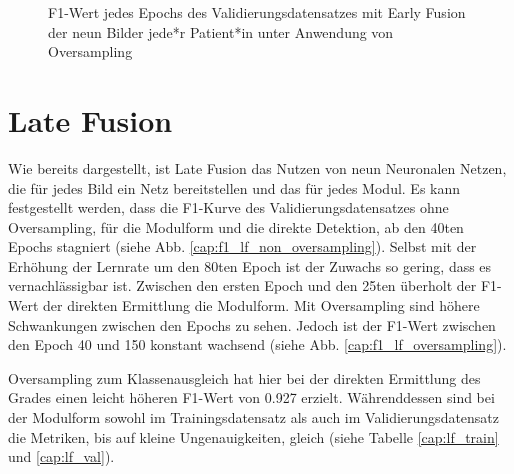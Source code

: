 \begin{figure}[b]\centering
\makebox[0pt]{}
\caption[F1-Wert jedes Epochs des Validierungsdatensatzes mit Early Fusion unter Anwendung von Oversampling]{F1-Wert jedes Epochs des Validierungsdatensatzes mit Early Fusion der neun Bilder jede*r Patient*in unter Anwendung von Oversampling}\label{cap:f1_ef_oversampling}
\end{figure}\label{fig:f1_ef_oversampling}

\clearpage
\section{Late Fusion}\label{latefusion}
Wie bereits dargestellt, ist Late Fusion das Nutzen von neun Neuronalen Netzen, die für jedes Bild ein Netz bereitstellen und das für jedes Modul. Es kann festgestellt werden, dass die F1-Kurve des Validierungsdatensatzes ohne Oversampling, für die Modulform und die direkte Detektion, ab den 40ten Epochs stagniert (siehe Abb. \ref{cap:f1_lf_non_oversampling}). Selbst mit der Erhöhung der Lernrate um den 80ten Epoch ist der Zuwachs so gering, dass es vernachlässigbar ist. Zwischen den ersten Epoch und den 25ten überholt der F1-Wert der direkten Ermittlung die Modulform. Mit Oversampling sind höhere Schwankungen zwischen den Epochs zu sehen. Jedoch ist der F1-Wert zwischen den Epoch 40 und 150 konstant wachsend (siehe Abb. \ref{cap:f1_lf_oversampling}).

Oversampling zum Klassenausgleich hat hier bei der direkten Ermittlung des Grades einen leicht höheren F1-Wert von 0.927 erzielt. Währenddessen sind bei der Modulform sowohl im Trainingsdatensatz als auch im Validierungsdatensatz die Metriken, bis auf kleine Ungenauigkeiten, gleich (siehe Tabelle \ref{cap:lf_train} und \ref{cap:lf_val}).

